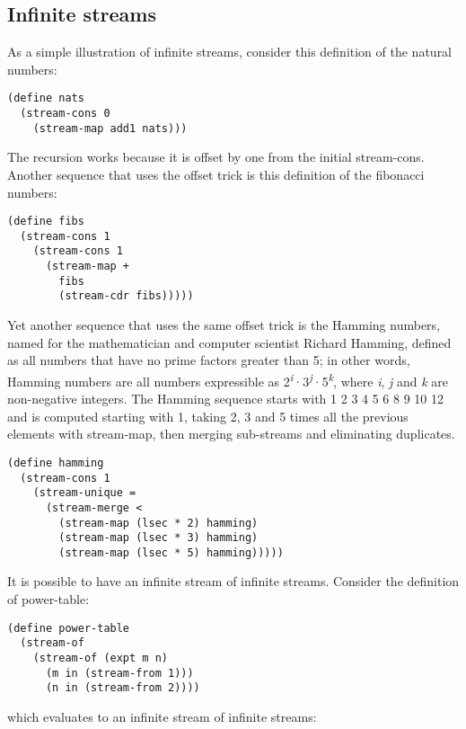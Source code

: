 \subsection{Infinite streams}\label{infinite-streams}

As a simple illustration of infinite streams, consider this definition
of the natural numbers:

\begin{verbatim}
(define nats
  (stream-cons 0
    (stream-map add1 nats)))
\end{verbatim}

The recursion works because it is offset by one from the initial
stream-cons. Another sequence that uses the offset trick is this
definition of the fibonacci numbers:

\begin{verbatim}
(define fibs
  (stream-cons 1
    (stream-cons 1
      (stream-map +
        fibs
        (stream-cdr fibs)))))
\end{verbatim}

Yet another sequence that uses the same offset trick is the Hamming
numbers, named for the mathematician and computer scientist Richard
Hamming, defined as all numbers that have no prime factors greater than
5; in other words, Hamming numbers are all numbers expressible as
2\textsuperscript{\emph{i}}·3\textsuperscript{\emph{j}}·5\textsuperscript{\emph{k}},
where \emph{i}, \emph{j} and \emph{k} are non-negative integers. The
Hamming sequence starts with 1 2 3 4 5 6 8 9 10 12 and is computed
starting with 1, taking 2, 3 and 5 times all the previous elements with
stream-map, then merging sub-streams and eliminating duplicates.

\begin{verbatim}
(define hamming
  (stream-cons 1
    (stream-unique =
      (stream-merge <
        (stream-map (lsec * 2) hamming)
        (stream-map (lsec * 3) hamming)
        (stream-map (lsec * 5) hamming)))))
\end{verbatim}

It is possible to have an infinite stream of infinite streams. Consider
the definition of power-table:

\begin{verbatim}
(define power-table
  (stream-of
    (stream-of (expt m n)
      (m in (stream-from 1)))
      (n in (stream-from 2))))
\end{verbatim}

which evaluates to an infinite stream of infinite streams:

